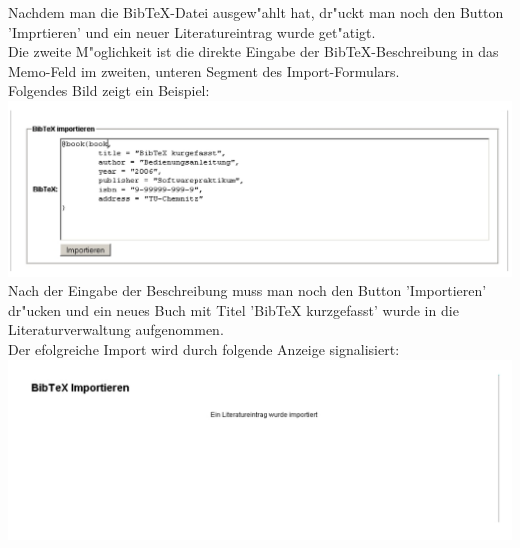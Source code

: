 Nachdem man die BibTeX-Datei ausgew"ahlt hat, dr"uckt man noch den Button 'Imprtieren' und ein neuer Literatureintrag wurde get"atigt.\\[0.4cm]
Die zweite M"oglichkeit ist die direkte Eingabe der BibTeX-Beschreibung in das Memo-Feld im zweiten, unteren Segment des Import-Formulars.\\
Folgendes Bild zeigt ein Beispiel:\\
\includegraphics[scale=0.8]{import2}\\
Nach der Eingabe der Beschreibung muss man noch den Button 'Importieren' dr"ucken und ein neues Buch mit Titel 'BibTeX kurzgefasst' wurde in die Literaturverwaltung aufgenommen.\\
Der efolgreiche Import wird durch folgende Anzeige signalisiert:\\
\includegraphics[scale=0.8]{import_succ}\\

